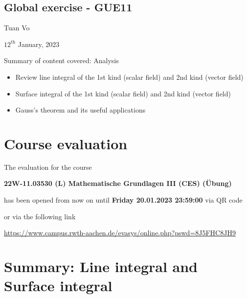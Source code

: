 \documentclass[12pt]{article}
\begin{document}
\begin{center}
	\section*{Global exercise - GUE11}
\end{center}
\begin{center}
	Tuan Vo
\end{center}
\begin{center}
	$12^{\text{th}}$ January, 2023
\end{center}
Summary of content covered: Analysis
\begin{itemize}
	\item Review line integral of the 1st kind (scalar field) and 2nd kind (vector field)
	\item Surface integral of the 1st kind (scalar field) and 2nd kind (vector field)
	\item Gauss's theorem and its useful applications
\end{itemize}
\section{Course evaluation}

The evaluation for the course

\begin{center}
	\textbf{22W-11.03530 (L) Mathematische Grundlagen III (CES) (Übung)}
\end{center}

has been opened from now on until \textbf{Friday 20.01.2023 23:59:00}
via QR code 


or via the following link 

\url{https://www.campus.rwth-aachen.de/evasys/online.php?pswd=8J5FHC8JH9}

\clearpage
\section{Summary: Line integral and Surface integral}
\end{document}
